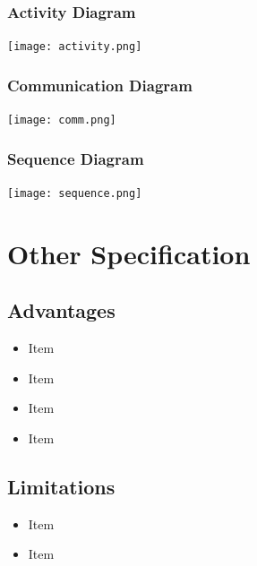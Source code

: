 \documentclass[oneside,a4paper,12pt, times]{book}
\begin{document}
 \subsection{Activity Diagram}
 \begin{center}
     \centering
\texttt{[image: activity.png]}
     \label{fig:my_label}
 \end{center}
  
\subsection{Communication Diagram}
\begin{center}
    \centering
    \texttt{[image: comm.png]}
    \label{fig:my_label}
\end{center}
   
\subsection{Sequence Diagram}
\begin{center}
    \centering
    \texttt{[image: sequence.png]}
    \label{fig:my_label}
\end{center}
      



\chapter{Other Specification}
\section{Advantages}
\begin{itemize}
	\item Item
    \item Item
    \item Item
    \item Item
\end{itemize}




\section{Limitations}
\begin{itemize}
	\item Item 
    \item Item
\end{itemize}
\end{document}
